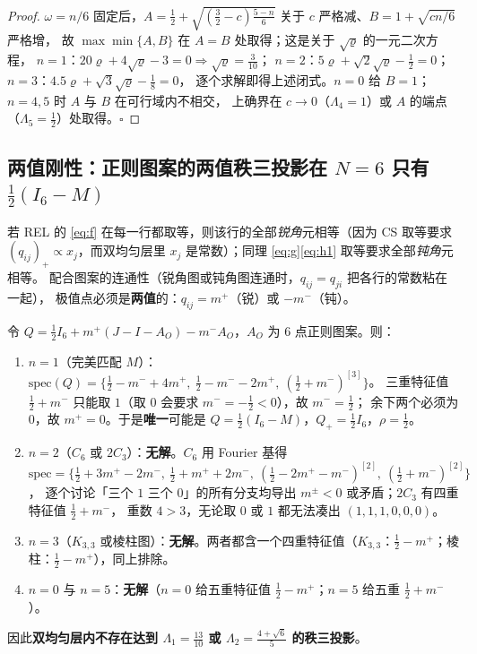 \begin{proof}
$\omega=n/6$ 固定后，$A=\frac12+\sqrt{(\frac32-c)\frac{5-n}6}$ 关于 $c$ 严格减、$B=1+\sqrt{cn/6}$ 严格增，
故 $\max\min\{A,B\}$ 在 $A=B$ 处取得；这是关于 $\sqrt\varrho$ 的一元二次方程，
$n=1$：$20\varrho+4\sqrt\varrho-3=0\Rightarrow\sqrt\varrho=\frac3{10}$；
$n=2$：$5\varrho+\sqrt2\sqrt\varrho-\frac12=0$；$n=3$：$4.5\varrho+\sqrt3\sqrt\varrho-\frac18=0$，
逐个求解即得上述闭式。$n=0$ 给 $B=1$；$n=4,5$ 时 $A$ 与 $B$ 在可行域内不相交，
上确界在 $c\to0$（$\Lambda_4=1$）或 $A$ 的端点（$\Lambda_5=\frac12$）处取得。$\square$
\end{proof}

\subsection{两值刚性：正则图案的两值秩三投影在 $N=6$ 只有 $\frac12(I_6-M)$}\label{sec:twovalue}

若 REL 的 \eqref{eq:f} 在每一行都取等，则该行的全部\emph{锐角}元相等（因为 CS 取等要求
$(q_{ij})_+\propto x_j$，而双均匀层里 $x_j$ 是常数）；同理 \eqref{eq:g}\eqref{eq:h1} 取等要求全部\emph{钝角}元相等。
配合图案的连通性（锐角图或钝角图连通时，$q_{ij}=q_{ji}$ 把各行的常数粘在一起），
极值点必须是\textbf{两值}的：$q_{ij}=m^+$（锐）或 $-m^-$（钝）。

\begin{proposition}\label{prop:twovalue}
令 $Q=\frac12I_6+m^+(J-I-A_O)-m^-A_O$，$A_O$ 为 $6$ 点正则图案。则：
\begin{enumerate}[label=(\alph*),leftmargin=2.2em]
\item $n=1$（完美匹配 $M$）：$\mathrm{spec}(Q)=\{\frac12-m^-+4m^+,\ \frac12-m^--2m^+,\ (\frac12+m^-)^{[3]}\}$。
三重特征值 $\frac12+m^-$ 只能取 $1$（取 $0$ 会要求 $m^-=-\frac12<0$），故 $m^-=\frac12$；
余下两个必须为 $0$，故 $m^+=0$。于是\textbf{唯一}可能是 $Q=\frac12(I_6-M)$，$Q_+=\frac12I_6$，$\rho=\frac12$。
\item $n=2$（$C_6$ 或 $2C_3$）：\textbf{无解}。$C_6$ 用 Fourier 基得
$\mathrm{spec}=\{\frac12+3m^+-2m^-,\ \frac12+m^++2m^-,\ (\frac12-2m^+-m^-)^{[2]},\ (\frac12+m^-)^{[2]}\}$，
逐个讨论「三个 $1$ 三个 $0$」的所有分支均导出 $m^\pm<0$ 或矛盾；$2C_3$ 有四重特征值 $\frac12+m^-$，
重数 $4>3$，无论取 $0$ 或 $1$ 都无法凑出 $(1,1,1,0,0,0)$。
\item $n=3$（$K_{3,3}$ 或棱柱图）：\textbf{无解}。两者都含一个四重特征值（$K_{3,3}$：$\frac12-m^+$；棱柱：$\frac12-m^+$），同上排除。
\item $n=0$ 与 $n=5$：\textbf{无解}（$n=0$ 给五重特征值 $\frac12-m^+$；$n=5$ 给五重 $\frac12+m^-$）。
\end{enumerate}
因此\textbf{双均匀层内不存在达到 $\Lambda_1=\frac{13}{10}$ 或 $\Lambda_2=\frac{4+\sqrt6}5$ 的秩三投影}。
\end{proposition}

